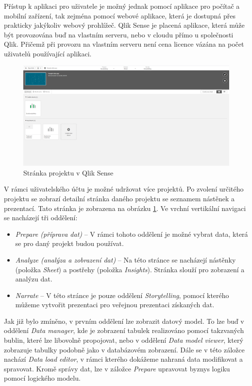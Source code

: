 \documentclass[czech,master,public,dept460,male,cpdeclaration,oneside]{diploma}
\begin{document}
Přístup k aplikaci pro uživatele je možný jednak pomocí aplikace pro počítač a mobilní zařízení, tak zejména pomocí webové aplikace, která je dostupná přes prakticky jakýkoliv webový prohlížeč. Qlik Sense je placená aplikace, která může být provozována buď na vlastním serveru, nebo v cloudu přímo u společnosti Qlik. Přičemž při provozu na vlastním serveru není cena licence vázána na počet uživatelů používající aplikaci.

\begin{figure}[!ht]
    \centering
    \includegraphics[width=1\textwidth]{Diplomka/Figures/qlik_project.png}
    \caption{Stránka projektu v Qlik Sense}
    \label{fig:qlik_project}
\end{figure}


V rámci uživatelského účtu je možné udržovat více projektů. Po zvolení určitého projektu se zobrazí detailní stránka daného projektu se seznamem nástěnek a prezentací. Tato stránka je zobrazena na obrázku \ref{fig:qlik_project}.  Ve vrchní vertikální navigaci se nacházejí tři oddělení:

\begin{itemize}
\item \textit{Prepare (příprava dat)} -- V rámci tohoto oddělení je možné vybrat data, která se pro daný projekt budou používat. 
\item \textit{Analyze (analýza a zobrazení dat)} -- Na této stránce se nacházejí nástěnky (položka \textit{Sheet}) a postřehy (položka \textit{Insights}). Stránka slouží pro zobrazení a analýzu dat.
\item \textit{Narrate} -- V této stránce je pouze oddělení \textit{Storytelling}, pomocí kterého můžeme vytvořit prezentaci pro veřejnou prezentaci získaných dat.
\end{itemize}


Jak již bylo zmíněno, v prvním oddělení lze zobrazit datový model. To lze buď v oddělení \textit{Data manager}, kde je zobrazení tabulek realizováno pomocí takzvaných bublin, které lze libovolně propojovat, nebo v oddělení \textit{Data model viewer}, který zobrazuje tabulky podobně jako v databázovém zobrazení. Dále se v této záložce nachází \textit{Data load editor}, v rámci kterého dokážeme nahraná data modifikovat a spravovat. Kromě správy dat, lze v záložce \textit{Prepare} upravovat byznys logiku pomocí logického modelu.
\end{document}
